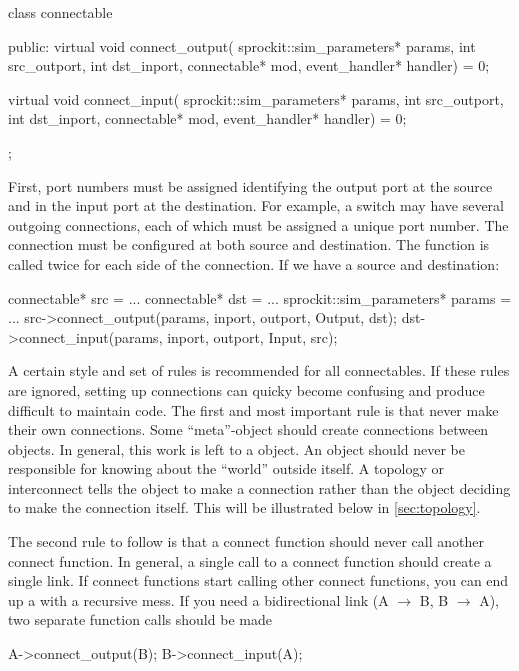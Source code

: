 \begin{CppCode}
class connectable
{
 public:
  virtual void
  connect_output(
    sprockit::sim_parameters* params,
    int src_outport,
    int dst_inport,
    connectable* mod,
    event_handler* handler) = 0;

  virtual void
  connect_input(
    sprockit::sim_parameters* params,
    int src_outport,
    int dst_inport,
    connectable* mod,
    event_handler* handler) = 0;


};
\end{CppCode}

First, port numbers must be assigned identifying the output port at the source and in the input port at the destination.
For example, a switch may have several outgoing connections, each of which must be assigned a unique port number.
The connection must be configured at both source and destination.
The function is called twice for each side of the connection. If we have a source and destination:

\begin{CppCode}
connectable* src = ...
connectable* dst = ...
sprockit::sim_parameters* params = ...
src->connect_output(params, inport, outport, Output, dst);
dst->connect_input(params, inport, outport, Input, src);
\end{CppCode}

A certain style and set of rules is recommended for all connectables.
If these rules are ignored, setting up connections can quicky become confusing and produce difficult to maintain code.
The first and most important rule is that  never make their own connections.
Some ``meta''-object should create connections between objects.
In general, this work is left to a  object.
An object should never be responsible for knowing about the ``world'' outside itself.
A topology or interconnect tells the object to make a connection rather than the object deciding to make the connection itself.
This will be illustrated below in \ref{sec:topology}.

The second rule to follow is that a connect function should never call another connect function.
In general, a single call to a connect function should create a single link.
If connect functions start calling other connect functions, you can end up a with a recursive mess.
If you need a bidirectional link (A $\rightarrow$ B, B $\rightarrow$ A),
two separate function calls should be made

\begin{CppCode}
A->connect_output(B);
B->connect_input(A);
\end{CppCode}

